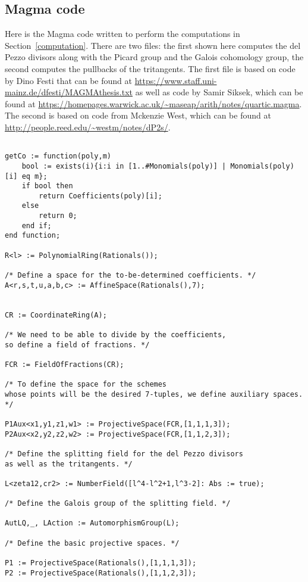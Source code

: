 \documentclass[12pt,twoside]{reedthesis}
\theoremstyle{plain}
\theoremstyle{definition}
\theoremstyle{remark}
\begin{document}
\begin{appendices}
\chapter{Magma code}
Here is the Magma code written to perform the computations in Section~\ref{computation}. There are two files: the first shown here computes the del Pezzo divisors along with the Picard group and the Galois cohomology group, the second computes the pullbacks of the tritangents. The first file is based on code by Dino Festi that can be found at \url{https://www.staff.uni-mainz.de/dfesti/MAGMAthesis.txt} as well as code by Samir Siksek, which can be found at \url{https://homepages.warwick.ac.uk/~maseap/arith/notes/quartic.magma}. The second is based on code from Mckenzie West, which can be found at \url{http://people.reed.edu/~westm/notes/dP2s/}.
\begin{verbatim}

getCo := function(poly,m)
	bool := exists(i){i:i in [1..#Monomials(poly)] | Monomials(poly)[i] eq m};
	if bool then
		return Coefficients(poly)[i];
	else
		return 0;
	end if;
end function;

R<l> := PolynomialRing(Rationals());

/* Define a space for the to-be-determined coefficients. */
A<r,s,t,u,a,b,c> := AffineSpace(Rationals(),7); 


CR := CoordinateRing(A);

/* We need to be able to divide by the coefficients, 
so define a field of fractions. */

FCR := FieldOfFractions(CR); 

/* To define the space for the schemes 
whose points will be the desired 7-tuples, we define auxiliary spaces. */

P1Aux<x1,y1,z1,w1> := ProjectiveSpace(FCR,[1,1,1,3]);
P2Aux<x2,y2,z2,w2> := ProjectiveSpace(FCR,[1,1,2,3]);

/* Define the splitting field for the del Pezzo divisors 
as well as the tritangents. */

L<zeta12,cr2> := NumberField([l^4-l^2+1,l^3-2]: Abs := true);

/* Define the Galois group of the splitting field. */

AutLQ,_, LAction := AutomorphismGroup(L);

/* Define the basic projective spaces. */

P1 := ProjectiveSpace(Rationals(),[1,1,1,3]);
P2 := ProjectiveSpace(Rationals(),[1,1,2,3]);


\end{verbatim}
\end{appendices}
\end{document}
